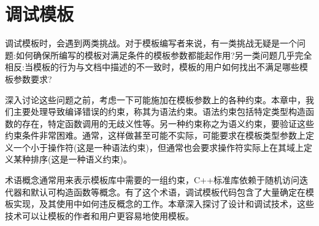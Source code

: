 \chapter{调试模板}
调试模板时，会遇到两类挑战。对于模板编写者来说，有一类挑战无疑是一个问题:如何确保所编写的模板对满足条件的模板参数都能起作用?另一类问题几乎完全相反:当模板的行为与文档中描述的不一致时，模板的用户如何找出不满足哪些模板参数要求?

深入讨论这些问题之前，考虑一下可能施加在模板参数上的各种约束。本章中，我们主要处理导致编译错误的约束，称其为语法约束。语法约束包括特定类型构造函数的存在，特定函数调用的无歧义性等。另一种约束称之为语义约束，要验证这些约束条件非常困难。通常，这样做甚至可能不实际，可能要求在模板类型参数上定义一个小于操作符(这是一种语法约束)，但通常也会要求操作符实际上在其域上定义某种排序(这是一种语义约束)。

术语概念通常用来表示模板库中需要的一组约束，C++标准库依赖于随机访问迭代器和默认可构造函数等概念。有了这个术语，调试模板代码包含了大量确定在模板实现，及其使用中如何违反概念的工作。本章深入探讨了设计和调试技术，这些技术可以让模板的作者和用户更容易地使用模板。





